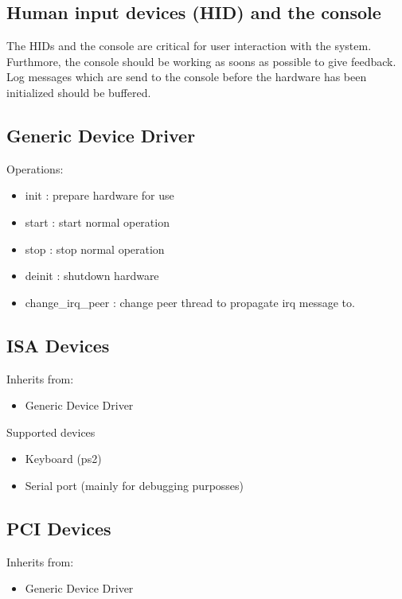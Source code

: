 \subsection{Human input devices (HID) and the console}

The HIDs and the console are critical for user interaction with the
system.  Furthmore, the console should be working as soons as possible
to give feedback.  Log messages which are send to the console before
the hardware has been initialized should be buffered.

\subsection{Generic Device Driver}

Operations:
\begin{itemize}
\item init : prepare hardware for use
\item start : start normal operation
\item stop : stop normal operation
\item deinit : shutdown hardware
\item change\_irq\_peer : change peer thread to propagate irq message to.
\end{itemize}

\subsection{ISA Devices}

Inherits from:
\begin{itemize}
\item Generic Device Driver
\end{itemize}

Supported devices
\begin{itemize}
\item Keyboard (ps2)
\item Serial port (mainly for debugging purposses)
\end{itemize}


\subsection{PCI Devices}

Inherits from:
\begin{itemize}
\item Generic Device Driver
\end{itemize}


